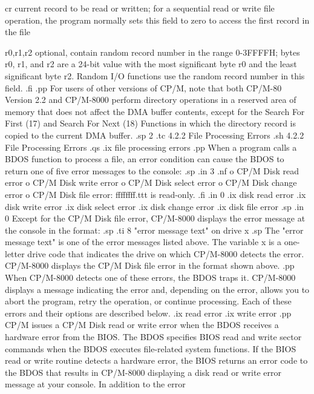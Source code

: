     cr       current record to be read or written;  
             for a sequential read or write file 
             operation, the program normally sets 
             this field to zero to access the first
             record in the file

    r0,r1,r2 optional, contain random record number 
             in the range 0-3FFFFH; bytes r0, r1, and r2
             are a 24-bit value with the most significant 
             byte r0 and the least significant byte r2. 
             Random I/O functions use the random record              
             number in this field.
.fi
.pp
For users of other versions of CP/M, note that both CP/M-80
Version 2.2 and CP/M-8000 perform directory operations in a
reserved area of memory that does not affect the DMA buffer
contents, except for the Search For First (17) and Search For
Next (18) Functions in which the directory record is copied to
the current DMA buffer. 
.sp 2
.tc         4.2.2  File Processing Errors
.sh
4.2.2  File Processing Errors
.qs
.ix file processing errors
.pp
When a program calls a BDOS function to process a file, an error condition can 
cause the BDOS to return one of five error messages to the console:
.sp 
.in 3
.nf
o CP/M Disk read error
o CP/M Disk write error
o CP/M Disk select error
o CP/M Disk change error
o CP/M Disk file error:  ffffffff.ttt is read-only.
.fi
.in 0
.ix disk read error
.ix disk write error
.ix disk select error
.ix disk change error
.ix disk file error
.sp 
.in 0
Except for the CP/M Disk file error, CP/M-8000 displays the error message at 
the console in the format:
.sp 
.ti 8
"error message text" on drive x
.sp  
The "error message text" is one of the error messages listed above. The
variable x is a one-letter drive code that indicates the drive on which
CP/M-8000 detects the error.  CP/M-8000 displays the CP/M Disk file error in
the format shown above. 
.pp
When CP/M-8000 detects one of these errors, the BDOS traps it. 
CP/M-8000 displays a message indicating the error and, depending on the 
error, allows you to abort the program, retry the operation, or continue
processing. Each of these errors and their options are described below.
.ix read error
.ix write error
.pp
CP/M issues a CP/M Disk read or write error when the BDOS receives a
hardware error from the BIOS.  The BDOS specifies BIOS read and write
sector commands when the BDOS executes file-related system functions. If
the BIOS read or write routine detects a hardware error, the BIOS returns
an error code to the BDOS that results in CP/M-8000 displaying a disk
read or write error message at your console. In addition to the error
